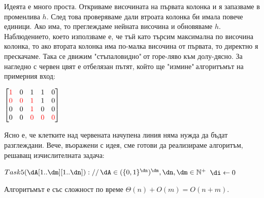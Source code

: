 \begin{solution}
	Идеята е много проста. Откриваме височината на първата колонка и я запазваме в променлива $h$. След това проверяваме дали втроата колонка би имала повече единици. Ако има, то преглеждаме нейната височина и обновяваме $h$. Наблюдението, което използваме е, че тъй като търсим максимална по височина колонка, то ако втората колонка има по-малка височина от първата, то директно я прескачаме. Така се движим "стъпаловидно"$\ $от горе-ляво към долу-дясно. За нагледно с червен цвят е отбелязан пътят, който ще "измине"$\ $алгоритъмът на примерния вход:
	\begin{center}
		$\begin{bmatrix}
			\textcolor{red}1 & 0 & 1 & 1 & 0\\
			\textcolor{red}0 & \textcolor{red}0 & \textcolor{red}1 & 1 & 0\\
			0 & 0 & \textcolor{red}1 & 0 & 0\\
			0 & 0 & \textcolor{red}0 & \textcolor{red}0 & \textcolor{red}0
		\end{bmatrix}$
	\end{center}
	Ясно е, че клетките над червената начупена линия няма нужда да бъдат разглеждани. Вече, въоражени с идея, сме готови да реализираме алгоритъм, решаващ изчислителната задача:
	\begin{pseudocode}
		
		$Task5(\dA[1..\dm][1..\dn])://\,\dA\in(\{0,1\}^{\dn})^{\dm},\dn,\dm\in\mathbb{N}^+$
		\Mybegin
		{	
			$\di\leftarrow0$\;
			\Myfor{$\dj\leftarrow\1$ $\KwTo$ $\dn$}
			{
			}
			\KwRet{$\di$\;}
		}
	\end{pseudocode}
	Алгоритъмът е със сложност по време $\Theta(n)+O(m)=O(n+m)$.
\end{solution}\vspace{0.35cm}

